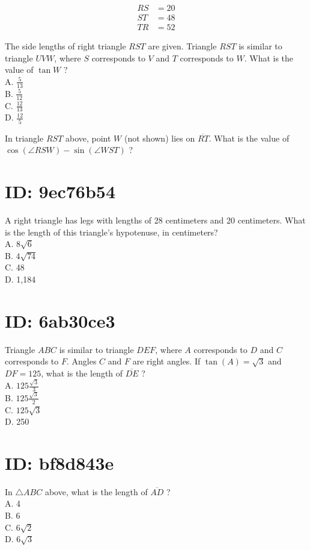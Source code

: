 $$
\begin{aligned}
R S & =20 \\
S T & =48 \\
T R & =52
\end{aligned}
$$

The side lengths of right triangle $R S T$ are given. Triangle $R S T$ is similar to triangle $U V W$, where $S$ corresponds to $V$ and $T$ corresponds to $W$. What is the value of $\tan W$ ?\\
A. $\frac{5}{13}$\\
B. $\frac{5}{12}$\\
C. $\frac{12}{13}$\\
D. $\frac{12}{5}$

In triangle $R S T$ above, point $W$ (not shown) lies on $\overline{R T}$. What is the value of $\cos (\angle R S W)-\sin (\angle W S T)$ ?

\section*{ID: 9ec76b54}
A right triangle has legs with lengths of 28 centimeters and 20 centimeters. What is the length of this triangle's hypotenuse, in centimeters?\\
A. $8 \sqrt{6}$\\
B. $4 \sqrt{74}$\\
C. 48\\
D. 1,184

\section*{ID: 6ab30ce3}
Triangle $A B C$ is similar to triangle $D E F$, where $A$ corresponds to $D$ and $C$ corresponds to $F$. Angles $C$ and $F$ are right angles. If $\tan (A)=\sqrt{3}$ and $D F=125$, what is the length of $\overline{D E}$ ?\\
A. $125 \frac{\sqrt{3}}{3}$\\
B. $125 \frac{\sqrt{3}}{2}$\\
C. $125 \sqrt{3}$\\
D. 250

\section*{ID: bf8d843e}
In $\triangle A B C$ above, what is the length of $\overline{A D}$ ?\\
A. 4\\
B. 6\\
C. $6 \sqrt{2}$\\
D. $6 \sqrt{3}$


